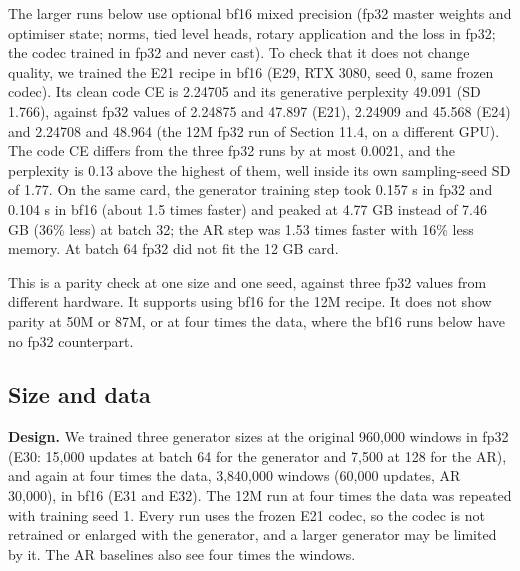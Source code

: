 \documentclass[
  british,
]{article}
\begin{document}
The larger runs below use optional bf16 mixed precision (fp32 master
weights and optimiser state; norms, tied level heads, rotary application
and the loss in fp32; the codec trained in fp32 and never cast). To
check that it does not change quality, we trained the E21 recipe in bf16
(E29, RTX 3080, seed 0, same frozen codec). Its clean code CE is 2.24705
and its generative perplexity 49.091 (SD 1.766), against fp32 values of
2.24875 and 47.897 (E21), 2.24909 and 45.568 (E24) and 2.24708 and
48.964 (the 12M fp32 run of Section 11.4, on a different GPU). The code
CE differs from the three fp32 runs by at most 0.0021, and the
perplexity is 0.13 above the highest of them, well inside its own
sampling-seed SD of 1.77. On the same card, the generator training step
took 0.157 s in fp32 and 0.104 s in bf16 (about 1.5 times faster) and
peaked at 4.77 GB instead of 7.46 GB (36\% less) at batch 32; the AR
step was 1.53 times faster with 16\% less memory. At batch 64 fp32 did
not fit the 12 GB card.

This is a parity check at one size and one seed, against three fp32
values from different hardware. It supports using bf16 for the 12M
recipe. It does not show parity at 50M or 87M, or at four times the
data, where the bf16 runs below have no fp32 counterpart.

\subsection{Size and data}\label{size-and-data}

\textbf{Design.} We trained three generator sizes at the original
960,000 windows in fp32 (E30: 15,000 updates at batch 64 for the
generator and 7,500 at 128 for the AR), and again at four times the
data, 3,840,000 windows (60,000 updates, AR 30,000), in bf16 (E31 and
E32). The 12M run at four times the data was repeated with training seed
1. Every run uses the frozen E21 codec, so the codec is not retrained or
enlarged with the generator, and a larger generator may be limited by
it. The AR baselines also see four times the windows.
\end{document}
